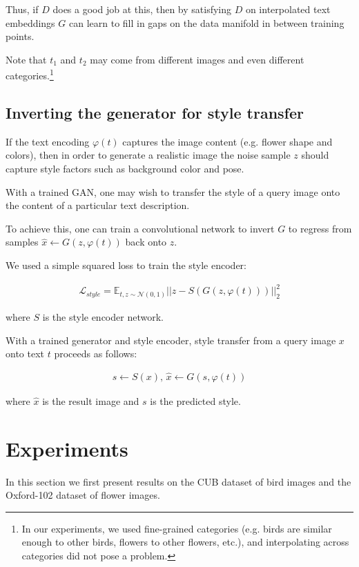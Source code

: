 Thus, if $D$ does a good job at this, then by satisfying $D$ on interpolated text embeddings $G$ can learn to fill in gaps on the data manifold in between training points.

Note that $t_1$ and $t_2$ may come from different images and even different categories.\footnote{In our experiments, we used fine-grained categories (e.g. birds are similar enough to other birds, flowers to other flowers, etc.), and interpolating across categories did not pose a problem.}

\subsection{Inverting the generator for style transfer}
\label{subsec:style}

If the text encoding $\varphi(t)$ captures the image content (e.g. flower shape and colors), then in order to generate a realistic image the noise sample $z$ should capture style factors such as background color and pose.

With a trained GAN, one may wish to transfer the style of a query image onto the content of a particular text description.

To achieve this, one can train a convolutional network to invert $G$ to regress from samples $\hat{x} \leftarrow G(z,\varphi(t))$ back onto $z$.

We used a simple squared loss to train the style encoder:

\begin{align}
\mathcal{L}_{style} = \mathbb{E}_{t, z \sim \mathcal{N}(0,1)} || z - S(G(z,\varphi(t))) ||^{2}_{2}
\end{align}

where $S$ is the style encoder network.

With a trained generator and style encoder, style transfer from a query image $x$ onto text $t$ proceeds as follows:

\begin{align}
s \leftarrow S(x)\text{,   }
\hat{x} \leftarrow G(s, \varphi(t))\nonumber
\end{align}

where $\hat{x}$ is the result image and $s$ is the predicted style.

\section{Experiments} 
\label{experiments}

In this section we first present results on the CUB dataset of bird images and the Oxford-102 dataset of flower images.

